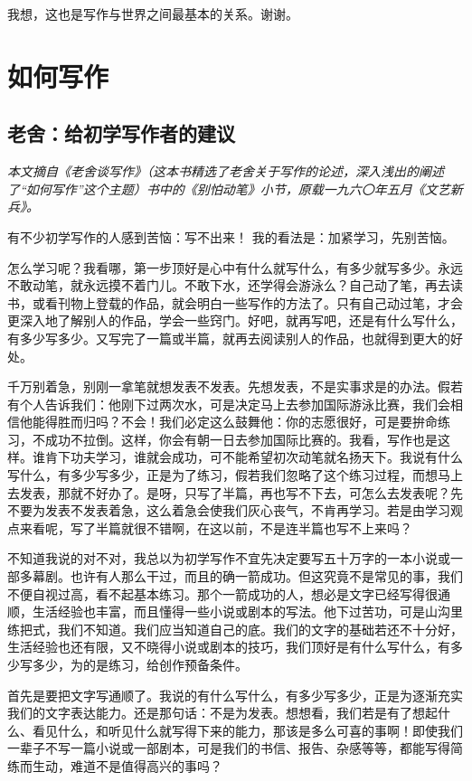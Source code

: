 \documentclass[12pt,a5paper]{ctexbook}
\begin{document}
我想，这也是写作与世界之间最基本的关系。谢谢。
\newpage

\chapter{如何写作}

\section{老舍：给初学写作者的建议}

\emph{本文摘自《老舍谈写作》（这本书精选了老舍关于写作的论述，深入浅出的阐述了“如何写作”这个主题）书中的《别怕动笔》小节，原载一九六〇年五月《文艺新兵》。}
\vspace{2em}

有不少初学写作的人感到苦恼：写不出来！
我的看法是：加紧学习，先别苦恼。

怎么学习呢？我看哪，第一步顶好是心中有什么就写什么，有多少就写多少。永远不敢动笔，就永远摸不着门儿。不敢下水，还学得会游泳么？自己动了笔，再去读书，或看刊物上登载的作品，就会明白一些写作的方法了。只有自己动过笔，才会更深入地了解别人的作品，学会一些窍门。好吧，就再写吧，还是有什么写什么，有多少写多少。又写完了一篇或半篇，就再去阅读别人的作品，也就得到更大的好处。

千万别着急，别刚一拿笔就想发表不发表。先想发表，不是实事求是的办法。假若有个人告诉我们：他刚下过两次水，可是决定马上去参加国际游泳比赛，我们会相信他能得胜而归吗？不会！我们必定这么鼓舞他：你的志愿很好，可是要拚命练习，不成功不拉倒。这样，你会有朝一日去参加国际比赛的。我看，写作也是这样。谁肯下功夫学习，谁就会成功，可不能希望初次动笔就名扬天下。我说有什么写什么，有多少写多少，正是为了练习，假若我们忽略了这个练习过程，而想马上去发表，那就不好办了。是呀，只写了半篇，再也写不下去，可怎么去发表呢？先不要为发表不发表着急，这么着急会使我们灰心丧气，不肯再学习。若是由学习观点来看呢，写了半篇就很不错啊，在这以前，不是连半篇也写不上来吗？

不知道我说的对不对，我总以为初学写作不宜先决定要写五十万字的一本小说或一部多幕剧。也许有人那么干过，而且的确一箭成功。但这究竟不是常见的事，我们不便自视过高，看不起基本练习。那个一箭成功的人，想必是文字已经写得很通顺，生活经验也丰富，而且懂得一些小说或剧本的写法。他下过苦功，可是山沟里练把式，我们不知道。我们应当知道自己的底。我们的文字的基础若还不十分好，生活经验也还有限，又不晓得小说或剧本的技巧，我们顶好是有什么写什么，有多少写多少，为的是练习，给创作预备条件。

首先是要把文字写通顺了。我说的有什么写什么，有多少写多少，正是为逐渐充实我们的文字表达能力。还是那句话：不是为发表。想想看，我们若是有了想起什么、看见什么，和听见什么就写得下来的能力，那该是多么可喜的事啊！即使我们一辈子不写一篇小说或一部剧本，可是我们的书信、报告、杂感等等，都能写得简练而生动，难道不是值得高兴的事吗？
\end{document}
